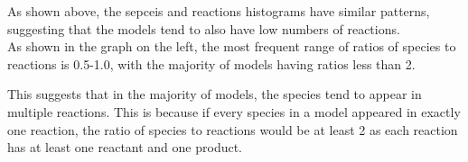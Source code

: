 \documentclass[portrait,a1paper,fontscale=0.49]{baposter}
\begin{document}
\begin{poster}
{\begin{multicols}{2}
  As shown above, the sepceis and reactions histograms have similar patterns, suggesting that the models tend to also have low numbers of reactions. \\
   
 As shown in the graph on the left, the most frequent range of ratios of species to reactions is 0.5-1.0, with the majority of models having ratios less than 2.
 
 This suggests that in the majority of models, the species tend to appear in multiple reactions. This is because if every species in a model appeared in exactly one reaction, the ratio of species to reactions would be at least 2 as each reaction has at least one reactant and one product.
 
 \end{multicols}
 }
 
 
 
 

\end{poster}
\end{document}
